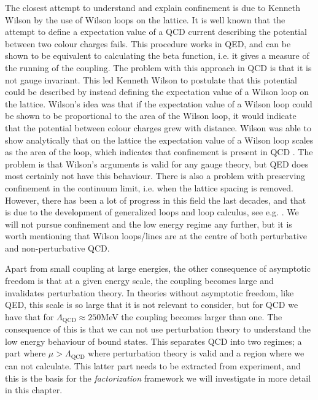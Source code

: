 The closest attempt to understand and explain confinement is due to Kenneth Wilson by the use of Wilson loops on the lattice. It is well known that the attempt to define a expectation value of a QCD current describing the potential between two colour charges fails. This procedure works in QED, and can be shown to be equivalent to calculating the beta function, i.e. it gives a measure of the running of the coupling. The problem with this approach in QCD is that it is not gauge invariant. This led Kenneth Wilson to postulate that this potential could be described by instead defining the expectation value of a Wilson loop on the lattice. Wilson's idea was that if the expectation value of a Wilson loop could be shown to be proportional to the area of the Wilson loop, it would indicate that the potential between colour charges grew with distance. Wilson was able to show analytically that on the lattice the expectation value of a Wilson loop scales as the area of the loop, which indicates that confinement is present in QCD \cite{Wilson:74}. The problem is that Wilson's arguments is valid for any gauge theory, but QED does most certainly not have this behaviour. There is also a problem with preserving confinement in the continuum limit, i.e. when the lattice spacing is removed. However, there has been a lot of progress in this field the last decades, and that is due to the development of generalized loops and loop calculus, see e.g. \cite{TAVARES_1994,MIGDAL1983199,KORCHEMSKY1986459}. We will not pursue confinement and the low energy regime any further, but it is worth mentioning that Wilson loops/lines are at the centre of both perturbative and non-perturbative QCD. 

Apart from small coupling at large energies, the other consequence of asymptotic freedom is that at a given energy scale, the coupling becomes large and invalidates perturbation theory. In theories without asymptotic freedom, like QED, this scale is so large that it is not relevant to consider, but for QCD we have that for $\Lambda_{\text{QCD}}\approx 250 $MeV the coupling becomes larger than one. The consequence of this is that we can not use perturbation theory to understand the low energy behaviour of bound states. This separates QCD into two regimes; a part where $\mu>\Lambda_{\text{QCD}}$ where perturbation theory is valid and a region where we can not calculate. This latter part needs to be extracted from experiment, and this is the basis for the \emph{factorization} framework we will investigate in more detail in this chapter. 